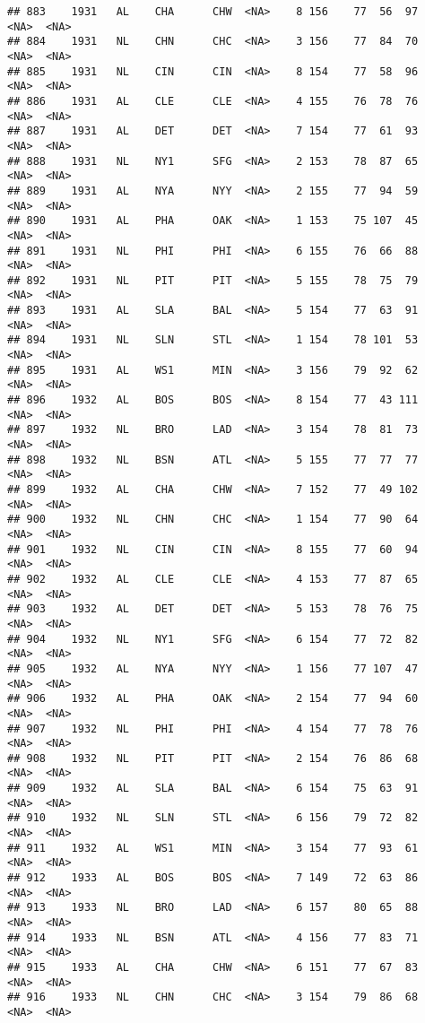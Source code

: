 \documentclass[]{article}
\begin{document}
\begin{verbatim}
## 883    1931   AL    CHA      CHW  <NA>    8 156    77  56  97   <NA>  <NA>
## 884    1931   NL    CHN      CHC  <NA>    3 156    77  84  70   <NA>  <NA>
## 885    1931   NL    CIN      CIN  <NA>    8 154    77  58  96   <NA>  <NA>
## 886    1931   AL    CLE      CLE  <NA>    4 155    76  78  76   <NA>  <NA>
## 887    1931   AL    DET      DET  <NA>    7 154    77  61  93   <NA>  <NA>
## 888    1931   NL    NY1      SFG  <NA>    2 153    78  87  65   <NA>  <NA>
## 889    1931   AL    NYA      NYY  <NA>    2 155    77  94  59   <NA>  <NA>
## 890    1931   AL    PHA      OAK  <NA>    1 153    75 107  45   <NA>  <NA>
## 891    1931   NL    PHI      PHI  <NA>    6 155    76  66  88   <NA>  <NA>
## 892    1931   NL    PIT      PIT  <NA>    5 155    78  75  79   <NA>  <NA>
## 893    1931   AL    SLA      BAL  <NA>    5 154    77  63  91   <NA>  <NA>
## 894    1931   NL    SLN      STL  <NA>    1 154    78 101  53   <NA>  <NA>
## 895    1931   AL    WS1      MIN  <NA>    3 156    79  92  62   <NA>  <NA>
## 896    1932   AL    BOS      BOS  <NA>    8 154    77  43 111   <NA>  <NA>
## 897    1932   NL    BRO      LAD  <NA>    3 154    78  81  73   <NA>  <NA>
## 898    1932   NL    BSN      ATL  <NA>    5 155    77  77  77   <NA>  <NA>
## 899    1932   AL    CHA      CHW  <NA>    7 152    77  49 102   <NA>  <NA>
## 900    1932   NL    CHN      CHC  <NA>    1 154    77  90  64   <NA>  <NA>
## 901    1932   NL    CIN      CIN  <NA>    8 155    77  60  94   <NA>  <NA>
## 902    1932   AL    CLE      CLE  <NA>    4 153    77  87  65   <NA>  <NA>
## 903    1932   AL    DET      DET  <NA>    5 153    78  76  75   <NA>  <NA>
## 904    1932   NL    NY1      SFG  <NA>    6 154    77  72  82   <NA>  <NA>
## 905    1932   AL    NYA      NYY  <NA>    1 156    77 107  47   <NA>  <NA>
## 906    1932   AL    PHA      OAK  <NA>    2 154    77  94  60   <NA>  <NA>
## 907    1932   NL    PHI      PHI  <NA>    4 154    77  78  76   <NA>  <NA>
## 908    1932   NL    PIT      PIT  <NA>    2 154    76  86  68   <NA>  <NA>
## 909    1932   AL    SLA      BAL  <NA>    6 154    75  63  91   <NA>  <NA>
## 910    1932   NL    SLN      STL  <NA>    6 156    79  72  82   <NA>  <NA>
## 911    1932   AL    WS1      MIN  <NA>    3 154    77  93  61   <NA>  <NA>
## 912    1933   AL    BOS      BOS  <NA>    7 149    72  63  86   <NA>  <NA>
## 913    1933   NL    BRO      LAD  <NA>    6 157    80  65  88   <NA>  <NA>
## 914    1933   NL    BSN      ATL  <NA>    4 156    77  83  71   <NA>  <NA>
## 915    1933   AL    CHA      CHW  <NA>    6 151    77  67  83   <NA>  <NA>
## 916    1933   NL    CHN      CHC  <NA>    3 154    79  86  68   <NA>  <NA>

\end{verbatim}
\end{document}
